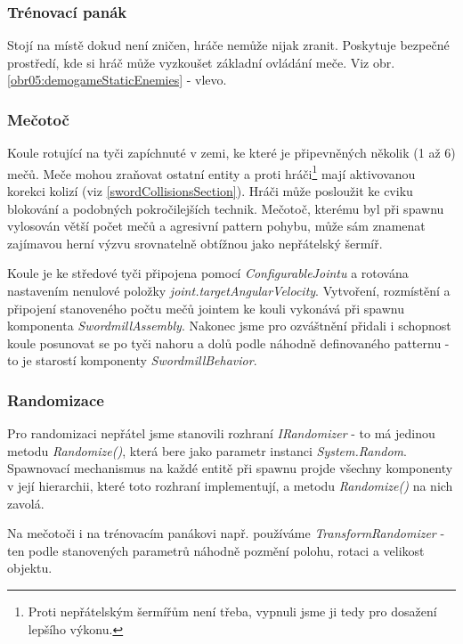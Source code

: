 \subsubsection*{Trénovací panák}

Stojí na místě dokud není zničen, hráče nemůže nijak zranit. Poskytuje bezpečné prostředí, kde si hráč může vyzkoušet základní ovládání meče. 
Viz obr. \ref{obr05:demogameStaticEnemies} - vlevo.

\subsubsection*{Mečotoč}

Koule rotující na tyči zapíchnuté v zemi, ke které je připevněných několik (1 až 6) mečů. Meče mohou zraňovat ostatní entity a proti hráči\footnote{Proti nepřátelským šermířům není třeba, vypnuli jsme ji tedy pro dosažení lepšího výkonu.} mají aktivovanou korekci kolizí (viz \ref{swordCollisionsSection}). Hráči může posloužit ke cviku blokování a podobných pokročilejších technik. Mečotoč, kterému byl při spawnu vylosován větší počet mečů a agresivní pattern pohybu, může sám znamenat zajímavou herní výzvu srovnatelně obtížnou jako nepřátelský šermíř. 

Koule je ke středové tyči připojena pomocí \textit{ConfigurableJointu} a rotována nastavením nenulové položky \textit{joint.targetAngularVelocity}. Vytvoření, rozmístění a připojení stanoveného počtu mečů jointem ke kouli vykonává při spawnu komponenta \textit{SwordmillAssembly}. Nakonec jsme pro ozváštnění přidali i schopnost koule posunovat se po tyči nahoru a dolů podle náhodně definovaného patternu - to je starostí komponenty \textit{SwordmillBehavior}.

\subsubsection*{Randomizace}

Pro randomizaci nepřátel jsme stanovili rozhraní \textit{IRandomizer} - to má jedinou metodu \textit{Randomize()}, která bere jako parametr instanci \textit{System.Random}. Spawnovací mechanismus na každé entitě při spawnu projde všechny komponenty v její hierarchii, které toto rozhraní implementují, a metodu \textit{Randomize()} na nich zavolá.

Na mečotoči i na trénovacím panákovi např. používáme \textit{TransformRandomizer} - ten podle stanovených parametrů náhodně pozmění polohu, rotaci a velikost objektu.


